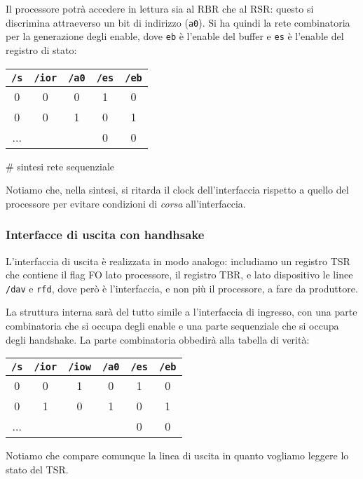 \documentclass[a4paper,11pt]{article}
\begin{document}
Il processore potrà accedere in lettura sia al RBR che al RSR: questo si discrimina attraeverso un bit di indirizzo (\lstinline|a0|).
Si ha quindi la rete combinatoria per la generazione degli enable, dove \lstinline|eb| è l'enable del buffer e \lstinline|es| è l'enable del registro di stato:
\begin{table}[h!]
	\center 
	\begin{tabular} { c  c  c | c  c }
		\lstinline|/s| & \lstinline|/ior| & \lstinline|/a0| & \lstinline|/es| & \lstinline|/eb| \\ 
		\hline 
		0 & 0 & 0 & 1 & 0 \\ 
		0 & 0 & 1 & 0 & 1 \\ 
		... & & & 0 & 0 
	\end{tabular}
\end{table}

# sintesi rete sequenziale

Notiamo che, nella sintesi, si ritarda il clock dell'interfaccia rispetto a quello del processore per evitare condizioni di \textit{corsa} all'interfaccia.

\subsubsection{Interfacce di uscita con handhsake}
L'interfaccia di uscita è realizzata in modo analogo: includiamo un registro TSR che contiene il flag FO lato processore, il registro TBR, e lato dispositivo le linee \lstinline|/dav| e \lstinline|rfd|, dove però è l'interfaccia, e non più il processore, a fare da produttore.

La struttura interna sarà del tutto simile a l'interfaccia di ingresso, con una parte combinatoria che si occupa degli enable e una parte sequenziale che si occupa degli handshake.
La parte combinatoria obbedirà alla tabella di verità:
\begin{table}[h!]
	\center 
	\begin{tabular} { c  c  c  c | c  c }
		\lstinline|/s| & \lstinline|/ior| & \lstinline|/iow| & \lstinline|/a0| & \lstinline|/es| & \lstinline|/eb| \\ 
		\hline 
		0 & 0 & 1 & 0 & 1 & 0 \\ 
		0 & 1 & 0 & 1 & 0 & 1 \\ 
		... & & & & 0 & 0 
	\end{tabular}
\end{table}

Notiamo che compare comunque la linea di uscita in quanto vogliamo leggere lo stato del TSR.
\end{document}
